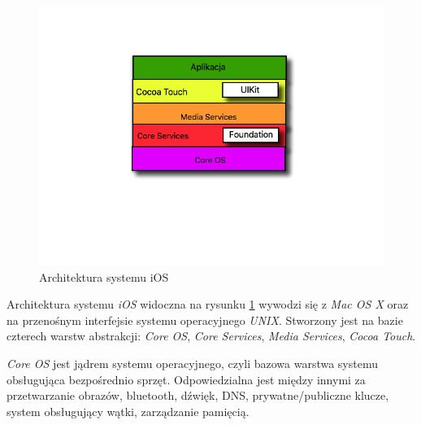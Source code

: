 \documentclass{iiuwb}
\begin{document}
\begin{figure}[!th]
\centering
\includegraphics[scale=.5]{image/ArchitekturaiOS.jpg}
\caption{Architektura systemu iOS}
\label{fig:Architektura iOS}
\end{figure}
Architektura systemu \textit{iOS}  widoczna na rysunku \ref{fig:Architektura iOS} wywodzi się z \textit{Mac OS X}  oraz na przenośnym interfejsie systemu operacyjnego \textit{UNIX}. Stworzony jest na bazie czterech warstw abstrakcji: \textit{Core OS}, \textit{Core Services}, \textit{Media Services}, \textit{Cocoa Touch}.

\textit{Core OS} jest jądrem systemu operacyjnego, czyli bazowa warstwa systemu obsługująca bezpośrednio sprzęt. Odpowiedzialna jest między innymi za przetwarzanie obrazów, bluetooth, dźwięk, DNS, prywatne/publiczne klucze, system obsługujący wątki, zarządzanie pamięcią.
\end{document}
